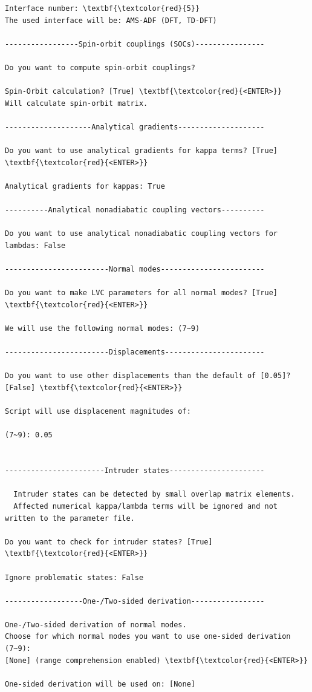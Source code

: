 \documentclass[a4paper,11pt,DIV=15,openany]{scrbook}
\begin{document}
\begin{oframed}
\begin{Verbatim}[commandchars=\\\{\}]
Interface number: \textbf{\textcolor{red}{5}}
The used interface will be: AMS-ADF (DFT, TD-DFT)

-----------------Spin-orbit couplings (SOCs)----------------

Do you want to compute spin-orbit couplings?

Spin-Orbit calculation? [True] \textbf{\textcolor{red}{<ENTER>}}
Will calculate spin-orbit matrix.

--------------------Analytical gradients--------------------

Do you want to use analytical gradients for kappa terms? [True] \textbf{\textcolor{red}{<ENTER>}}

Analytical gradients for kappas: True

----------Analytical nonadiabatic coupling vectors----------

Do you want to use analytical nonadiabatic coupling vectors for lambdas: False

------------------------Normal modes------------------------

Do you want to make LVC parameters for all normal modes? [True] \textbf{\textcolor{red}{<ENTER>}}

We will use the following normal modes: (7~9)

------------------------Displacements-----------------------

Do you want to use other displacements than the default of [0.05]? [False] \textbf{\textcolor{red}{<ENTER>}}

Script will use displacement magnitudes of:

(7~9): 0.05
 

-----------------------Intruder states----------------------

  Intruder states can be detected by small overlap matrix elements.
  Affected numerical kappa/lambda terms will be ignored and not written to the parameter file.

Do you want to check for intruder states? [True] \textbf{\textcolor{red}{<ENTER>}}

Ignore problematic states: False

------------------One-/Two-sided derivation-----------------

One-/Two-sided derivation of normal modes.
Choose for which normal modes you want to use one-sided derivation (7~9): 
[None] (range comprehension enabled) \textbf{\textcolor{red}{<ENTER>}}

One-sided derivation will be used on: [None]



\end{Verbatim}
\end{oframed}
\end{document}
